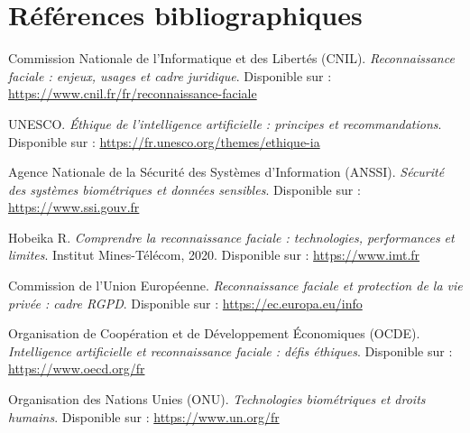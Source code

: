 \documentclass[11pt,a4paper]{article}
\begin{document}
\newpage 
\section*{\Huge Références bibliographiques}
\renewcommand{\refname}{} 
\begin{thebibliography}{99}
	
	
	Commission Nationale de l’Informatique et des Libertés (CNIL).
	\textit{Reconnaissance faciale : enjeux, usages et cadre juridique}.
	Disponible sur : \url{https://www.cnil.fr/fr/reconnaissance-faciale}
	
	UNESCO.
	\textit{Éthique de l’intelligence artificielle : principes et recommandations}.
	Disponible sur : \url{https://fr.unesco.org/themes/ethique-ia}
	
	Agence Nationale de la Sécurité des Systèmes d’Information (ANSSI).
	\textit{Sécurité des systèmes biométriques et données sensibles}.
	Disponible sur : \url{https://www.ssi.gouv.fr}
	
	Hobeika R.
	\textit{Comprendre la reconnaissance faciale : technologies, performances et limites}.
	Institut Mines-Télécom, 2020.
	Disponible sur : \url{https://www.imt.fr}
	
	Commission de l'Union Européenne.
	\textit{Reconnaissance faciale et protection de la vie privée : cadre RGPD}.
	Disponible sur : \url{https://ec.europa.eu/info}
	
	Organisation de Coopération et de Développement Économiques (OCDE).
	\textit{Intelligence artificielle et reconnaissance faciale : défis éthiques}.
	Disponible sur : \url{https://www.oecd.org/fr}
	
	Organisation des Nations Unies (ONU).
	\textit{Technologies biométriques et droits humains}.
	Disponible sur : \url{https://www.un.org/fr}
	
\end{thebibliography}
\end{document}

